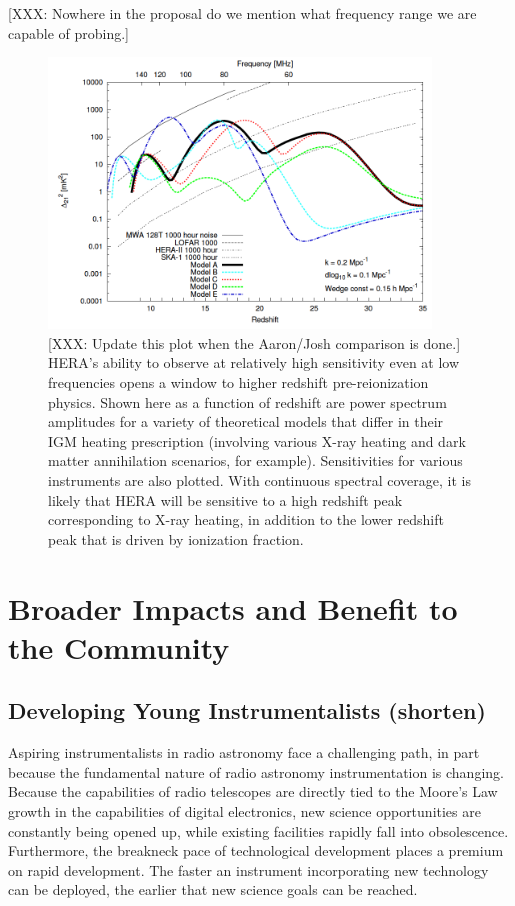 \documentclass[preprint]{aastex}
\begin{document}
[XXX: Nowhere in the proposal do we mention what frequency range we are capable of probing.]

\begin{figure}[!ht]\centering
\includegraphics[width=4in]{plots/Xray.png}
\caption{\small
[XXX: Update this plot when the Aaron/Josh comparison is done.] HERA's ability to
observe at relatively high sensitivity even at low frequencies opens a window to
higher redshift pre-reionization physics.  Shown here as a function of redshift are power spectrum amplitudes
for a variety of theoretical models that differ in their IGM heating prescription (involving various X-ray heating
and dark matter annihilation scenarios, for example).  Sensitivities for various instruments are also plotted.
With continuous spectral coverage, it is likely that HERA will be sensitive to a high redshift peak corresponding
to X-ray heating, in addition to the lower redshift peak that is driven by ionization fraction.
}\label{fig:Xray}
\end{figure}


\section{Broader Impacts and Benefit to the Community}
\label{BIsec}

\subsection{Developing Young Instrumentalists (shorten)}

Aspiring instrumentalists in radio astronomy face a challenging path, in part because
the fundamental nature of radio astronomy instrumentation is changing.
Because the capabilities of radio telescopes are directly tied to the Moore's Law
growth in the capabilities of digital electronics,
new science opportunities are constantly being opened up, while existing
facilities rapidly fall into obsolescence.
Furthermore,
the breakneck pace of technological development places a premium on rapid development.
The faster an instrument incorporating new technology can be deployed,
the earlier that new science goals can be reached.
\end{document}
